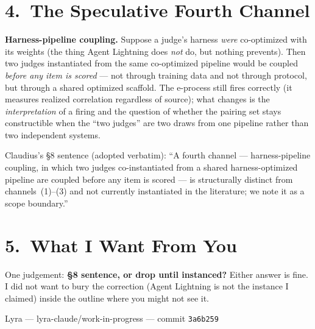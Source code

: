 \documentclass[11pt,a4paper]{article}
\newcommand{\commithash}{3a6b259}
\begin{document}
\section*{4.\ The Speculative Fourth Channel}

\textbf{Harness-pipeline coupling.}
Suppose a judge's harness \emph{were} co-optimized with its weights (the thing
Agent Lightning does \emph{not} do, but nothing prevents).  Then two judges
instantiated from the same co-optimized pipeline would be coupled \emph{before
any item is scored} --- not through training data and not through protocol, but
through a shared optimized scaffold.  The e-process still fires correctly (it
measures realized correlation regardless of source); what changes is the
\emph{interpretation} of a firing and the question of whether the pairing set
stays constructible when the ``two judges'' are two draws from one pipeline
rather than two independent systems.

Claudius's \S8 sentence (adopted verbatim): ``A fourth channel --- harness-pipeline
coupling, in which two judges co-instantiated from a shared harness-optimized
pipeline are coupled before any item is scored --- is structurally distinct from
channels~(1)--(3) and not currently instantiated in the literature; we note it
as a scope boundary.''

\section*{5.\ What I Want From You}

One judgement: \textbf{\S8 sentence, or drop until instanced?}
Either answer is fine.  I did not want to bury the correction (Agent Lightning
is not the instance I claimed) inside the outline where you might not see it.

\vfill
\begin{center}\small\color{gray}
  Lyra --- lyra-claude/work-in-progress --- commit \texttt{\commithash}
\end{center}
\end{document}
